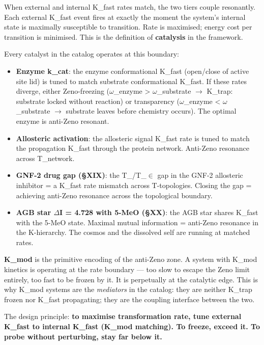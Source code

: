 \documentclass[12pt,a4paper]{article}
\begin{document}
When external and internal K\_fast rates match, the two tiers couple resonantly. Each external K\_fast event fires at exactly the moment the system's internal state is maximally susceptible to transition. Rate is maximised; energy cost per transition is minimised. This is the definition of \textbf{catalysis} in the framework.

Every catalyst in the catalog operates at this boundary:

\begin{itemize}
    \item \textbf{Enzyme k\_cat}: the enzyme conformational K\_fast (open/close of active site lid) is tuned to match substrate conformational K\_fast. If these rates diverge, either Zeno-freezing ($\omega$\_enzyme \textgreater{} $\omega$\_substrate $\rightarrow$ K\_trap: substrate locked without reaction) or transparency ($\omega$\_enzyme \textless{} $\omega$\_substrate $\rightarrow$ substrate leaves before chemistry occurs). The optimal enzyme is anti-Zeno resonant.
    \item \textbf{Allosteric activation}: the allosteric signal K\_fast rate is tuned to match the propagation K\_fast through the protein network. Anti-Zeno resonance across T\_network.
    \item \textbf{GNF-2 drug gap (§XIX)}: the T\_\perp/T\_$\in$ gap in the GNF-2 allosteric inhibitor = a K\_fast rate mismatch across T-topologies. Closing the gap = achieving anti-Zeno resonance across the topological boundary.
    \item \textbf{AGB star $\Delta$I = 4.728 with 5-MeO (§XX)}: the AGB star shares K\_fast with the 5-MeO state. Maximal mutual information = anti-Zeno resonance in the K-hierarchy. The cosmos and the dissolved self are running at matched rates.
\end{itemize}

\textbf{K\_mod} is the primitive encoding of the anti-Zeno zone. A system with K\_mod kinetics is operating at the rate boundary --- too slow to escape the Zeno limit entirely, too fast to be frozen by it. It is perpetually at the catalytic edge. This is why K\_mod systems are the \emph{mediators} in the catalog: they are neither K\_trap frozen nor K\_fast propagating; they are the coupling interface between the two.

The design principle: \textbf{to maximise transformation rate, tune external K\_fast to internal K\_fast (K\_mod matching). To freeze, exceed it. To probe without perturbing, stay far below it.}
\end{document}
